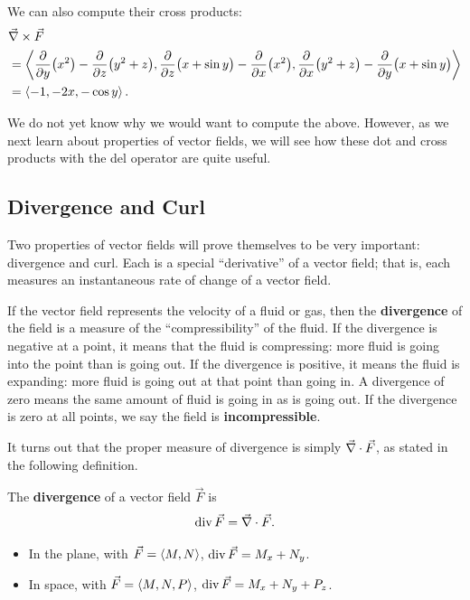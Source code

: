We can also compute their cross products:\small
\begin{align*}
	&\vec\nabla\times \vec F\\
	&= {\left\langle \frac{\partial}{\partial y}\bigl(x^2\bigr)-\frac{\partial}{\partial z}\bigl(y^2+z\bigr),\frac{\partial}{\partial z}\bigl(x+\sin y\bigr)-\frac{\partial}{\partial x}\bigl(x^2\bigr),\frac{\partial}{\partial x}\bigl(y^2+z\bigr)-\frac{\partial}{\partial y}\bigl(x+\sin y\bigr)\right\rangle}\\
	&=\left\langle -1,-2x,-\cos y\right\rangle.
\end{align*}\normalsize

We do not yet know why we would want to compute the above. However, as we next learn about properties of vector fields, we will see how these dot and cross products with the del operator are quite useful.

\subsection{Divergence and Curl}

Two properties of vector fields will prove themselves to be very important: divergence and curl. Each is a special ``derivative'' of a vector field; that is, each measures an instantaneous rate of change of a vector field.

If the vector field represents the velocity of a fluid or gas, then the \textbf{divergence} of the field is a measure of the ``compressibility'' of the fluid. If the divergence is negative at a point, it means that the fluid is compressing: more fluid is going into the point than is going out. If the divergence is positive, it means the fluid is expanding: more fluid is going out at that point than going in. A divergence of zero means the same amount of fluid is going in as is going out. If the divergence is zero at all points, we say the field is \textbf{incompressible}.

It turns out that the proper measure of divergence is simply $\vec\nabla \cdot \vec F$, as stated in the following definition.

\begin{definition}\label{def:divergence}%
The \textbf{divergence} of a vector field $\vec F$ is
\[\operatorname{div} \vec F = \vec\nabla \cdot \vec F.\]
\begin{itemize}
	\item In the plane, with $\vec F =\left\langle M,N\right\rangle$, $\operatorname{div} \vec F = M_x+N_y$.
	\item	In space, with $\vec F =\left\langle M,N,P\right\rangle$, $\operatorname{div} \vec F = M_x+N_y+P_z$.
\end{itemize}
\end{definition}

